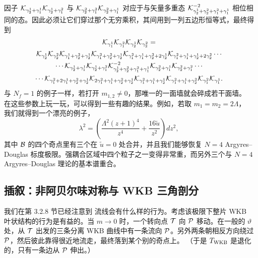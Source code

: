 因子
$\mathcal{K}_{\gamma_2^1+\gamma_1^1}\mathcal{K}_{\gamma_2^1+\gamma_1^2}$ 与
$\mathcal{K}_{\gamma_2^2+\gamma_1^2}\mathcal{K}_{\gamma_2^2+\gamma_1^1}$
对应于与矢量多重态 $\mathcal{K}_{\gamma_2^1+\gamma_2^2+\gamma_1^2+\gamma_1^1}^{-2}$
相位相同的态。因此必须让它们穿过那个无穷乘积，其间用到一列五边形恒等式，最终得到
\begin{multline}
\mathcal{K}_{\gamma_1^1}\mathcal{K}_{\gamma_1^2} \mathcal{K}_{\gamma_2^1}\mathcal{K}_{\gamma_2^2}
= \\ \mathcal{K}_{\gamma_2^1}  \mathcal{K}_{\gamma_2^2}\mathcal{K}_{\gamma_1^1+\gamma_2^2+\gamma_2^1} \mathcal{K}_{\gamma_1^2+\gamma_2^2+\gamma_2^1}\mathcal{K}_{\gamma_1^2+\gamma_1^1+\gamma_2^2+2\gamma_2^1}
\mathcal{K}_{\gamma_1^2+\gamma_1^1+\gamma_2^1+2\gamma_2^2}\cdots \\ \cdots\mathcal{K}_{\gamma_2^1+\gamma_1^1} \mathcal{K}_{\gamma_2^1+\gamma_1^2}
\mathcal{K}_{\gamma_2^1+\gamma_2^2+\gamma_1^2+\gamma_1^1}^{-2}\mathcal{K}_{\gamma_2^2+\gamma_1^1}
\mathcal{K}_{\gamma_2^2+\gamma_1^2} \cdots \\ \cdots \mathcal{K}_{\gamma_1^2+2\gamma_1^1+\gamma_2^2+\gamma_2^1}
\mathcal{K}_{2\gamma_1^2+\gamma_1^1+\gamma_2^2+\gamma_2^1}\mathcal{K}_{\gamma_1^2+\gamma_1^1+\gamma_2^1} \mathcal{K}_{\gamma_1^2+\gamma_1^1+\gamma_2^2}  \mathcal{K}_{\gamma_1^2}  \mathcal{K}_{\gamma_1^1}.
\end{multline}
与 $N_f = 1$ 的例子一样，若打开 $m_{1,2} \neq 0$，那唯一的一面墙就会碎成若干面墙。
在这些参数上玩一玩，可以得到一些有趣的结果。例如，若取 $m_1 = m_2 = 2 \Lambda$，
我们就得到一个漂亮的例子，
\begin{equation}
\lambda^2 = \left( \frac{\Lambda^2(z+1)^4}{z^4} + \frac{16 \tilde u}{z^2} \right) dz^2,
\end{equation}
其中 $\mathcal{B}$ 的四个奇点里有三个在 $\tilde u = 0$ 处合并，并且我们能够恢复 $N=4$
Argyres--Douglas 标度极限。强耦合区域中四个粒子之一变得非常重，而另外三个与 $N=4$
Argyres--Douglas 理论的基本谱重合。

\subsection{插叙：非阿贝尔味对称与 WKB 三角剖分} \label{subsec:intermission-flavor}

我们在第 3.2.8 节已经注意到%
流线会有什么样的行为。考虑该极限下整片 WKB 叶状结构的行为是有益的。当 $m \to 0$ 时，一个转向点
$\mathcal{T}$ 向 $\mathcal{P}$ 移动。在一般的 $\vartheta$ 处，从 $\mathcal{T}$ 出发的三条分离 WKB 曲线中有一条流向
$\mathcal{P}$。另外两条朝相反方向绕过 $\mathcal{P}$，然后彼此靠得很近地流走，最终落到某个别的奇点上。
（于是 $T_{\rm WKB}$ 是退化的，只有一条边从 $\mathcal{P}$ 伸出。）

